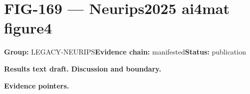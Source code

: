 \clearpage
\section{FIG-169 --- Neurips2025 ai4mat figure4}
\label{figpage:fig-169}
\textbf{Group:} LEGACY-NEURIPS\quad \textbf{Evidence chain:} manifested\quad \textbf{Status:} publication

\textbf{Results text draft.} 
\textbf{Discussion and boundary.} 


\textbf{Evidence pointers.}



\vfill
